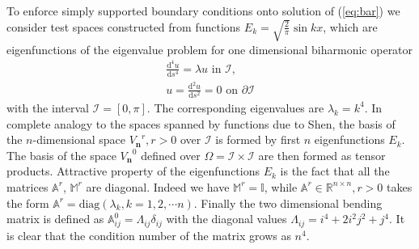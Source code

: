\documentclass{marine_2015}
\newcommand{\Vh}{\ensuremath{V_{\mathbf{n}}}}
\newcommand{\deriv}[2]{\ensuremath{\frac{\mathrm{d}#1}{\mathrm{d}#2}}}
\begin{document}
To enforce simply supported boundary conditions onto solution of (\ref{eq:bar}) 
we consider test spaces constructed from functions $E_k=\sqrt{\tfrac{2}{\pi}}\sin{kx}$,
which are eigenfunctions of the eigenvalue problem for one dimensional biharmonic 
operator
\[
  \begin{aligned}
  \deriv{^4 u}{s^4} = \lambda u\text{ in }\mathcal{I},\\
  u = \deriv{^2 u}{s^2} = 0\text{ on }\partial\mathcal{I}
  \end{aligned}
\]
with the interval $\mathcal{I}=\left[0, \pi\right]$. The corresponding
eigenvalues are $\lambda_k=k^4$. In complete analogy to the spaces spanned by
functions due to Shen, the basis of the $n$-dimensional space $\Vh^r, r>0$ over
$\mathcal{I}$ is formed by first $n$ eigenfunctions $E_k$. The basis of the
space $\Vh^0$ defined over $\Omega=\mathcal{I}\times\mathcal{I}$ are then formed
as tensor products. Attractive property of the eigenfunctions $E_k$ is the fact
that all the matrices $\mathbb{A}^r$, $\mathbb{M}^r$ are diagonal. Indeed we
have $\mathbb{M}^r=\mathbb{I}$, while $\mathbb{A}^r\in\mathbb{R}^{n \times n},
r>0$ takes the form $\mathbb{A}^r=\text{diag}\left(\lambda_k, k=1, 2, \cdots
n\right)$. Finally the two dimensional bending matrix is defined as $\mathbb{A}^0_{ij}=
\Lambda_{ij}\delta_{ij}$ with the diagonal values $\Lambda_{ij}= i^4 + 2 i^2 j^2 + j^4$.
It is clear that the condition number of the matrix grows as $n^4$. 
\end{document}
